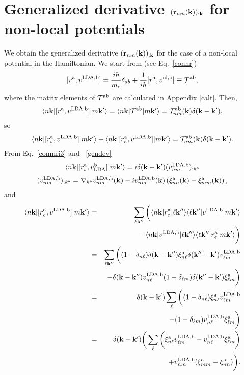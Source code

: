 \section{Generalized derivative $(\mathbf{r}_{nm}(\mathbf{k}))_{;\mathbf{k}}$ for
  non-local potentials}\label{gdernl}

We obtain the generalized derivative $(\mathbf{r}_{nm}(\mathbf{k}))_{;\mathbf{k}}$ for
the case of a non-local potential in the Hamiltonian.
We start from (see Eq.~\eqref{conhr})
\begin{eqnarray}\label{na_hrdab}
[r^{\mathrm{a}},v^{\mathrm{LDA},\mathrm{b}}]= 
\frac{i\hbar}{m_e}\delta_{ab}+
\frac{1}{i\hbar}[r^{\mathrm{a}},v^{\mathrm{nl},\mathrm{b}}]
\equiv
{\cal T}^{\mathrm{a}\mathrm{b}}
,
\end{eqnarray} 
where the matrix elements of ${\cal T}^{\mathrm{a}\mathrm{b}}$ are calculated in
Appendix \ref{calt}.
Then,
\begin{eqnarray}\label{na_hrdab2}
\langle n\mathbf{k} |[r^{\mathrm{a}},v^{\mathrm{LDA},\mathrm{b}}]| m\mathbf{k}' \rangle
=
\langle n\mathbf{k} |{\cal T}^{\mathrm{a}\mathrm{b}}| m\mathbf{k}' \rangle
=
{\cal T}^{\mathrm{a}\mathrm{b}}_{nm}(\mathbf{k})\delta(\mathbf{k}-\mathbf{k}')
,
\end{eqnarray}
so
\begin{eqnarray}\label{na_hrdab3}
\langle n\mathbf{k} |[r^{\mathrm{a}}_i,v^{\mathrm{LDA},\mathrm{b}}]| m\mathbf{k}' \rangle
+
\langle n\mathbf{k} |[r^{\mathrm{a}}_e,v^{\mathrm{LDA},\mathrm{b}}]| m\mathbf{k}' \rangle
=
{\cal T}^{\mathrm{a}\mathrm{b}}_{nm}(\mathbf{k})\delta(\mathbf{k}-\mathbf{k}')
.
\end{eqnarray}
From Eq.~\eqref{conmri3} and ~\eqref{gendev}
\begin{eqnarray}\label{na_rip}
\langle n\mathbf{k} |[r^{\mathrm{a}}_i,v_{\mathrm{LDA}}^{\mathrm{b}}]| m\mathbf{k}' \rangle
=i\delta(\mathbf{k}-\mathbf{k}')(v_{nm}^{\mathrm{LDA},\mathrm{b}})_{;k^{\mathrm{a}}}
\end{eqnarray}
\begin{eqnarray}\label{na_ripn}
(v^{\mathrm{LDA},\mathrm{b}}_{nm})_{;k^{\mathrm{a}}}=
\nabla_{k^{\mathrm{a}}}
v^{\mathrm{LDA},\mathrm{b}}_{n m}(\mathbf{k})
-
i
v^{\mathrm{LDA},\mathrm{b}}_{nm}(\mathbf{k})
\left(
\xi^{\mathrm{a}}_{nn}(\mathbf{k})
-
\xi^{\mathrm{a}}_{mm}(\mathbf{k})
\right)
,
\end{eqnarray}
and
\begin{eqnarray}\label{na_rep}
\langle n\mathbf{k} |[r^{\mathrm{a}}_e,v^{\mathrm{LDA},\mathrm{b}}]| m\mathbf{k}' \rangle&=&
\sum_{\ell\mathbf{k}''}
\bigg(
\langle n\mathbf{k} |r^{\mathrm{a}}_e| \ell\mathbf{k}'' \rangle\langle \ell\mathbf{k}'' |v^{\mathrm{LDA},\mathrm{b}}| m\mathbf{k}' \rangle
\nonumber \\
&&
-
\langle n\mathbf{k} |v^{\mathrm{LDA},\mathrm{b}}| \ell\mathbf{k}'' \rangle\langle \ell\mathbf{k}'' |r^{\mathrm{a}}_e| m\mathbf{k}' \rangle
\bigg)
\nonumber \\
&=&
\sum_{\ell\mathbf{k}''}
\bigg(
(1-\delta_{n\ell})\delta(\mathbf{k}-\mathbf{k}'')\xi^{\mathrm{a}}_{n\ell}
\delta(\mathbf{k}''-\mathbf{k}')v^{\mathrm{LDA},\mathrm{b}}_{\ell m}
\nonumber \\
&&-
\delta(\mathbf{k}-\mathbf{k}'')v^{\mathrm{LDA},\mathrm{b}}_{n\ell}
(1-\delta_{\ell m})\delta(\mathbf{k}''-\mathbf{k}')\xi^{\mathrm{a}}_{\ell m}
\bigg)
\nonumber \\
&=&
\delta(\mathbf{k}-\mathbf{k}')
\sum_{\ell}
\bigg(
(1-\delta_{n\ell})
\xi^{\mathrm{a}}_{n\ell}
v^{\mathrm{LDA},\mathrm{b}}_{\ell m}
\nonumber \\
&&-
(1-\delta_{\ell m})
v^{\mathrm{LDA},\mathrm{b}}_{n\ell}
\xi^{\mathrm{a}}_{\ell m}
\bigg)
\nonumber \\
&=&
\delta(\mathbf{k}-\mathbf{k}')
\bigg(
\sum_{\ell}
\bigg(
\xi^{\mathrm{a}}_{n\ell}
v^{\mathrm{LDA},\mathrm{b}}_{\ell m}
-
v^{\mathrm{LDA},\mathrm{b}}_{n\ell}
\xi^{\mathrm{a}}_{\ell m}
\bigg)
\nonumber \\
&&+
v^{\mathrm{LDA},\mathrm{b}}_{nm}(\xi^{\mathrm{a}}_{mm}
-
\xi^{\mathrm{a}}_{nn}
)
\bigg)
.
\end{eqnarray}
